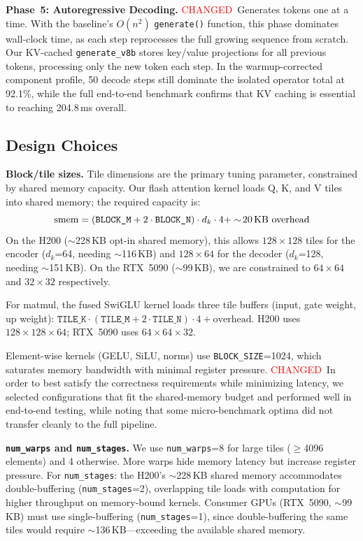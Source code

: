 \documentclass{article}
\newcommand{\chg}[1]{{\color{blue}#1}}
\newcommand{\chglabel}{{\setlength{\fboxsep}{1pt}\colorbox{yellow!45}{\textcolor{red}{\scriptsize CHANGED}}}}
\begin{document}
\textbf{Phase~5: Autoregressive Decoding.}
\chglabel\ \chg{Generates tokens one at a time.  With the baseline's $O(n^2)$ \texttt{generate()} function, this phase dominates wall-clock time, as each step reprocesses the full growing sequence from scratch.  Our KV-cached \texttt{generate\_v8b} stores key/value projections for all previous tokens, processing only the new token each step.  In the warmup-corrected component profile, 50 decode steps still dominate the isolated operator total at 92.1\%, while the full end-to-end benchmark confirms that KV caching is essential to reaching 204.8\,ms overall.}

\subsection{Design Choices}

\textbf{Block/tile sizes.}
Tile dimensions are the primary tuning parameter, constrained by shared memory capacity.  Our flash attention kernel loads Q, K, and V tiles into shared memory; the required capacity is:
\begin{equation}
\text{smem} = (\texttt{BLOCK\_M} + 2 \cdot \texttt{BLOCK\_N}) \cdot d_k \cdot 4 + \sim\!20\text{\,KB overhead}
\label{eq:smem}
\end{equation}
On the H200 ($\sim$228\,KB opt-in shared memory), this allows $128 \times 128$ tiles for the encoder ($d_k$=64, needing $\sim$116\,KB) and $128 \times 64$ for the decoder ($d_k$=128, needing $\sim$151\,KB).  On the RTX~5090 ($\sim$99\,KB), we are constrained to $64 \times 64$ and $32 \times 32$ respectively.

For matmul, the fused SwiGLU kernel loads three tile buffers (input, gate weight, up weight): $\texttt{TILE\_K} \cdot (\texttt{TILE\_M} + 2 \cdot \texttt{TILE\_N}) \cdot 4 + \text{overhead}$.  H200 uses $128 \times 128 \times 64$; RTX~5090 uses $64 \times 64 \times 32$.

Element-wise kernels (GELU, SiLU, norms) use \texttt{BLOCK\_SIZE}=1024, which saturates memory bandwidth with minimal register pressure.
\chglabel\ \chg{In order to best satisfy the correctness requirements while minimizing latency, we selected configurations that fit the shared-memory budget and performed well in end-to-end testing, while noting that some micro-benchmark optima did not transfer cleanly to the full pipeline.}

\textbf{\texttt{num\_warps} and \texttt{num\_stages}.}
We use \texttt{num\_warps}=8 for large tiles ($\geq$4096 elements) and 4 otherwise.  More warps hide memory latency but increase register pressure.
For \texttt{num\_stages}: the H200's $\sim$228\,KB shared memory accommodates double-buffering (\texttt{num\_stages}=2), overlapping tile loads with computation for higher throughput on memory-bound kernels.  Consumer GPUs (RTX~5090, $\sim$99\,KB) must use single-buffering (\texttt{num\_stages}=1), since double-buffering the same tiles would require $\sim$136\,KB---exceeding the available shared memory.
\end{document}
